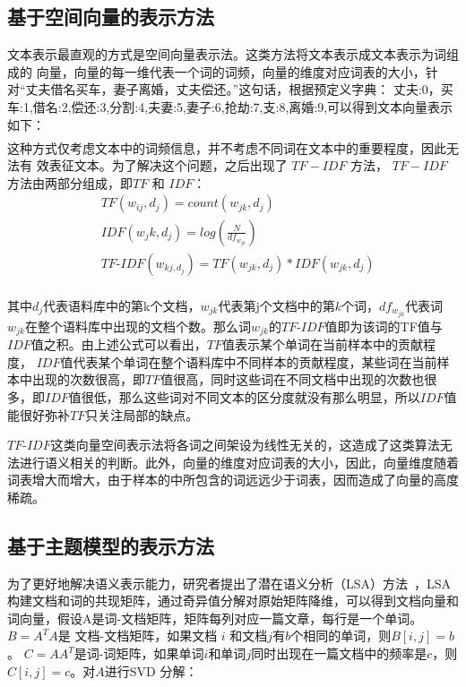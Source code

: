 \subsection{基于空间向量的表示方法}
文本表示最直观的方式是空间向量表示法。这类方法将文本表示成文本表示为词组成的
向量，向量的每一维代表一个词的词频，向量的维度对应词表的大小，针对“丈夫借名买车，妻子离婚，丈夫偿还。”这句话，根据预定义字典： {丈夫:0，买车:1,借名:2,偿还:3,分割:4,夫妻:5,妻子:6,抢劫:7,支:8,离婚:9},可以得到文本向量表示如下：
\begin{eqnarray*}
[2,1,1,1,0,1,0,0,0,1]
\end{eqnarray*}
这种方式仅考虑文本中的词频信息，并不考虑不同词在文本中的重要程度，因此无法有
效表征文本。为了解决这个问题，之后出现了 $TF-IDF$ 方法， $TF-IDF$ 方法由两部分组成，即$TF$ 和 $IDF$：
\begin{equation}
\begin{aligned}
    & TF(w_{ij},d_j)=count(w_{jk},d_j)\\
    & IDF(w_jk,d_j)=log(\frac{N}{df_{w_{jk}}})\\
    & TF\textrm{-}IDF(w_{kj,d_j})=TF(w_{jk},d_j)*IDF(w_{jk},d_j)\\
\end{aligned}
\end{equation}

其中$d_j$代表语料库中的第k个文档，$w_{jk}$代表第j个文档中的第$k$个词，$df_{w_{jk}}$代表词$w_{jk}$在整个语料库中出现的文档个数。那么词$w_{jk}$的$TF\textrm{-}IDF$值即为该词的TF值与$IDF$值之积。由上述公式可以看出，$TF$值表示某个单词在当前样本中的贡献程度， $IDF$值代表某个单词在整个语料库中不同样本的贡献程度，某些词在当前样本中出现的次数很高，即$TF$值很高，同时这些词在不同文档中出现的次数也很多，即$IDF$值很低，那么这些词对不同文本的区分度就没有那么明显，所以$IDF$值能很好弥补$TF$只关注局部的缺点。

$TF\textrm{-}IDF$这类向量空间表示法将各词之间架设为线性无关的，这造成了这类算法无法进行语义相关的判断。此外，向量的维度对应词表的大小，因此，向量维度随着词表增大而增大，由于样本的中所包含的词远远少于词表，因而造成了向量的高度稀疏。

\subsection{基于主题模型的表示方法}
为了更好地解决语义表示能力，研究者提出了潜在语义分析（LSA）方法~\cite{DeerwesterDLFH90}，LSA构建文档和词的共现矩阵，通过奇异值分解对原始矩阵降维，可以得到文档向量和词向量，假设A是词\textrm{-}文档矩阵，矩阵每列对应一篇文章，每行是一个单词。 $B = A^{T}A$是 文档\textrm{-}文档矩阵，如果文档 $i$ 和文档$j$有$b$个相同的单词，则$B[i,j]=b$。 $C = AA^{T}$是词\textrm{-}词矩阵，如果单词$i$和单词$j$同时出现在一篇文档中的频率是$c$，则$C[i,j]=c$。对$A$进行SVD 分解：

